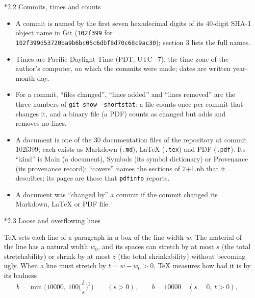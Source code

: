 \documentclass[10pt,a4paper]{article}
\makeatletter
\renewcommand\subsection{\@startsection{subsection}{2}{\z@}{-3.25ex\@plus -1ex \@minus -.2ex}{1.5ex \@plus .2ex}{\normalfont\large\bfseries\raggedright}}
\makeatother
\begin{document}
\subsection*{2.2 Commits, times and counts}
\begin{itemize}
\item A commit is named by the first seven hexadecimal digits of its 40-digit SHA-1 object name in Git (\texttt{102f399} for \texttt{102f399d\allowbreak{}53720ba9\allowbreak{}b6bc05c6\allowbreak{}dbf8d70c\allowbreak{}68c9ac30}); section 3 lists the full names.
\item Times are Pacific Daylight Time (PDT, UTC−7), the time zone of the author’s computer, on which the commits were made; dates are written year-month-day.
\item For a commit, “files changed”, “lines added” and “lines removed” are the three numbers of \texttt{git show --shortstat}: a file counts once per commit that changes it, and a binary file (a PDF) counts as changed but adds and removes no lines.
\item A document is one of the 30 documentation files of the repository at commit 102f399; each exists as Markdown (\texttt{.md}), LaTeX (\texttt{.tex}) and PDF (\texttt{.pdf}). Its “kind” is Main (a document), Symbols (its symbol dictionary) or Provenance (its provenance record); “covers” names the sections of 7+1.nb that it describes; its pages are those that \texttt{pdfinfo} reports.
\item A document was “changed by” a commit if the commit changed its Markdown, LaTeX or PDF file.
\end{itemize}
\subsection*{2.3 Loose and overflowing lines}
TeX sets each line of a paragraph in a box of the line width $w$. The material of the line has a natural width $w_0$, and its spaces can stretch by at most $s$ (the total stretchability) or shrink by at most $z$ (the total shrinkability) without becoming ugly. When a line must stretch by $t=w-w_0>0$, TeX measures how bad it is by its badness
\begin{equation*}
b=\min\Big(10000,\ 100\Big(\frac ts\Big)^3\Big)\qquad(s>0),\qquad b=10000\quad(s=0,\ t>0),
\end{equation*}
\end{document}

